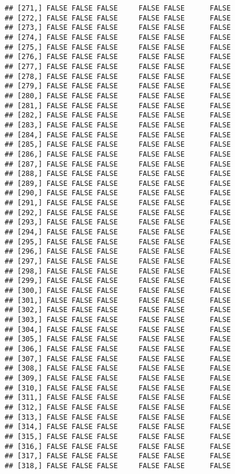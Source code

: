 \documentclass[
]{article}
\begin{document}
\begin{verbatim}
## [271,] FALSE FALSE FALSE     FALSE FALSE      FALSE
## [272,] FALSE FALSE FALSE     FALSE FALSE      FALSE
## [273,] FALSE FALSE FALSE     FALSE FALSE      FALSE
## [274,] FALSE FALSE FALSE     FALSE FALSE      FALSE
## [275,] FALSE FALSE FALSE     FALSE FALSE      FALSE
## [276,] FALSE FALSE FALSE     FALSE FALSE      FALSE
## [277,] FALSE FALSE FALSE     FALSE FALSE      FALSE
## [278,] FALSE FALSE FALSE     FALSE FALSE      FALSE
## [279,] FALSE FALSE FALSE     FALSE FALSE      FALSE
## [280,] FALSE FALSE FALSE     FALSE FALSE      FALSE
## [281,] FALSE FALSE FALSE     FALSE FALSE      FALSE
## [282,] FALSE FALSE FALSE     FALSE FALSE      FALSE
## [283,] FALSE FALSE FALSE     FALSE FALSE      FALSE
## [284,] FALSE FALSE FALSE     FALSE FALSE      FALSE
## [285,] FALSE FALSE FALSE     FALSE FALSE      FALSE
## [286,] FALSE FALSE FALSE     FALSE FALSE      FALSE
## [287,] FALSE FALSE FALSE     FALSE FALSE      FALSE
## [288,] FALSE FALSE FALSE     FALSE FALSE      FALSE
## [289,] FALSE FALSE FALSE     FALSE FALSE      FALSE
## [290,] FALSE FALSE FALSE     FALSE FALSE      FALSE
## [291,] FALSE FALSE FALSE     FALSE FALSE      FALSE
## [292,] FALSE FALSE FALSE     FALSE FALSE      FALSE
## [293,] FALSE FALSE FALSE     FALSE FALSE      FALSE
## [294,] FALSE FALSE FALSE     FALSE FALSE      FALSE
## [295,] FALSE FALSE FALSE     FALSE FALSE      FALSE
## [296,] FALSE FALSE FALSE     FALSE FALSE      FALSE
## [297,] FALSE FALSE FALSE     FALSE FALSE      FALSE
## [298,] FALSE FALSE FALSE     FALSE FALSE      FALSE
## [299,] FALSE FALSE FALSE     FALSE FALSE      FALSE
## [300,] FALSE FALSE FALSE     FALSE FALSE      FALSE
## [301,] FALSE FALSE FALSE     FALSE FALSE      FALSE
## [302,] FALSE FALSE FALSE     FALSE FALSE      FALSE
## [303,] FALSE FALSE FALSE     FALSE FALSE      FALSE
## [304,] FALSE FALSE FALSE     FALSE FALSE      FALSE
## [305,] FALSE FALSE FALSE     FALSE FALSE      FALSE
## [306,] FALSE FALSE FALSE     FALSE FALSE      FALSE
## [307,] FALSE FALSE FALSE     FALSE FALSE      FALSE
## [308,] FALSE FALSE FALSE     FALSE FALSE      FALSE
## [309,] FALSE FALSE FALSE     FALSE FALSE      FALSE
## [310,] FALSE FALSE FALSE     FALSE FALSE      FALSE
## [311,] FALSE FALSE FALSE     FALSE FALSE      FALSE
## [312,] FALSE FALSE FALSE     FALSE FALSE      FALSE
## [313,] FALSE FALSE FALSE     FALSE FALSE      FALSE
## [314,] FALSE FALSE FALSE     FALSE FALSE      FALSE
## [315,] FALSE FALSE FALSE     FALSE FALSE      FALSE
## [316,] FALSE FALSE FALSE     FALSE FALSE      FALSE
## [317,] FALSE FALSE FALSE     FALSE FALSE      FALSE
## [318,] FALSE FALSE FALSE     FALSE FALSE      FALSE

\end{verbatim}
\end{document}
